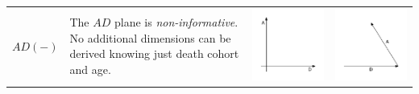 \documentclass[
  12pt
]{scrartcl}
\begin{document}
\begin{center}
\begin{longtable}{m{}m{}m{}m{}}
  \midrule
  $AD(-)$ &
  The $AD$ plane is \emph{non-informative}. No additional dimensions can be derived knowing just death cohort and age. &
  \includegraphics[width = \linewidth]{../fig/AD.pdf} &
  \includegraphics[width = \linewidth]{../fig/AD_iso.pdf}  \\

\end{longtable}
\end{center}
\end{document}
